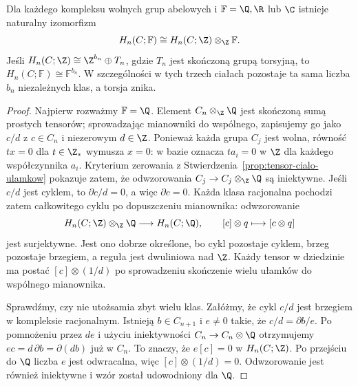 \begin{twierdzenie}
\label{thm:homologia-char-zero}
Dla każdego kompleksu wolnych grup abelowych
i $\mathbb F=\Q,\R$ lub $\C$ istnieje naturalny
izomorfizm
\begin{equation}\label{eq:homologia-char-zero}
 H_n(C;\mathbb F)
 \cong H_n(C;\Z)\otimes_{\Z}\mathbb F.
\end{equation}
Jeśli $H_n(C;\Z)\cong\Z^{b_n}\oplus T_n$,
gdzie $T_n$ jest skończoną grupą torsyjną, to
$H_n(C;\mathbb F)\cong\mathbb F^{b_n}$.
W szczególności w tych trzech ciałach
pozostaje ta sama liczba $b_n$ niezależnych
klas, a torsja znika.
\end{twierdzenie}
\begin{proof}
Najpierw rozważmy $\mathbb F=\Q$.
Element $C_n\otimes_{\Z}\Q$ jest skończoną
sumą prostych tensorów; sprowadzając
mianowniki do wspólnego, zapisujemy go jako
$c/d$ z $c\in C_n$ i niezerowym
$d\in\Z$. Ponieważ każda grupa $C_j$
jest wolna, równość $tx=0$ dla $t\in\Z_*$ wymusza
$x=0$: w bazie oznacza $ta_i=0$ w $\Z$ dla każdego współczynnika $a_i$.
Kryterium zerowania z
Stwierdzenia~\ref{prop:tensor-cialo-ulamkow} pokazuje zatem,
że odwzorowania $C_j\to C_j\otimes_{\Z}\Q$ są iniektywne.
Jeśli $c/d$ jest cyklem, to
$\partial c/d=0$, a więc $\partial c=0$.
Każda klasa racjonalna pochodzi zatem
całkowitego cyklu po dopuszczeniu mianownika:
odwzorowanie
\[
 H_n(C;\Z)\otimes_{\Z}\Q\longrightarrow H_n(C;\Q),
 \qquad [c]\otimes q\longmapsto[c\otimes q]
\]
jest surjektywne. Jest ono dobrze określone,
bo cykl pozostaje cyklem, brzeg pozostaje
brzegiem, a reguła jest dwuliniowa nad $\Z$.
Każdy tensor w dziedzinie ma postać $[c]\otimes(1/d)$
po sprowadzeniu skończenie wielu ułamków do wspólnego mianownika.

Sprawdźmy, czy nie utożsamia zbyt wielu klas.
Załóżmy, że cykl $c/d$ jest brzegiem
w kompleksie racjonalnym. Istnieją
$b\in C_{n+1}$ i $e\ne0$ takie, że
$c/d=\partial b/e$. Po pomnożeniu przez
$de$ i użyciu iniektywności
$C_n\to C_n\otimes\Q$ otrzymujemy
$ec=d\,\partial b=\partial(db)$
już w $C_n$. To znaczy, że $e[c]=0$
w $H_n(C;\Z)$. Po przejściu do $\Q$
liczba $e$ jest odwracalna, więc
$[c]\otimes(1/d)=0$. Odwzorowanie jest
również iniektywne i wzór został
udowodniony dla $\Q$.


\end{proof}
